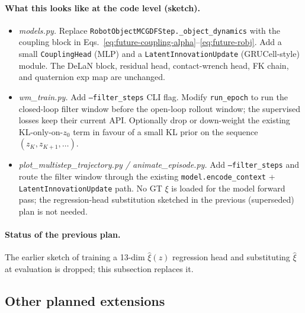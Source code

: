 \documentclass[11pt]{article}
\begin{document}
\paragraph{What this looks like at the code level (sketch).}
\begin{itemize}
  \item \emph{models.py.} Replace \texttt{RobotObjectMCGDFStep.\_object\_dynamics}
    with the coupling block in
    Eqs.~\eqref{eq:future-coupling-alpha}--\eqref{eq:future-robj}.
    Add a small \texttt{CouplingHead} (MLP) and a
    \texttt{LatentInnovationUpdate} (GRUCell-style) module. The DeLaN
    block, residual head, contact-wrench head, FK chain, and quaternion
    exp map are unchanged.
  \item \emph{wm\_train.py.} Add \texttt{--filter\_steps} CLI flag.
    Modify \texttt{run\_epoch} to run the closed-loop filter window
    before the open-loop rollout window; the supervised losses keep
    their current API.  Optionally drop or down-weight the existing
    KL-only-on-$z_0$ term in favour of a small KL prior on the
    sequence $(z_K, z_{K+1}, \dots)$.
  \item \emph{plot\_multistep\_trajectory.py / animate\_episode.py.}
    Add \texttt{--filter\_steps} and route the filter window through
    the existing \texttt{model.encode\_context} +
    \texttt{LatentInnovationUpdate} path. No GT $\xi$ is loaded for
    the model forward pass; the regression-head substitution sketched
    in the previous (superseded) plan is not needed.
\end{itemize}

\paragraph{Status of the previous plan.}
The earlier sketch of training a 13-dim $\hat\xi(z)$ regression head
and substituting $\hat\xi$ at evaluation is dropped; this subsection
replaces it.

\subsection{Other planned extensions}
\end{document}
